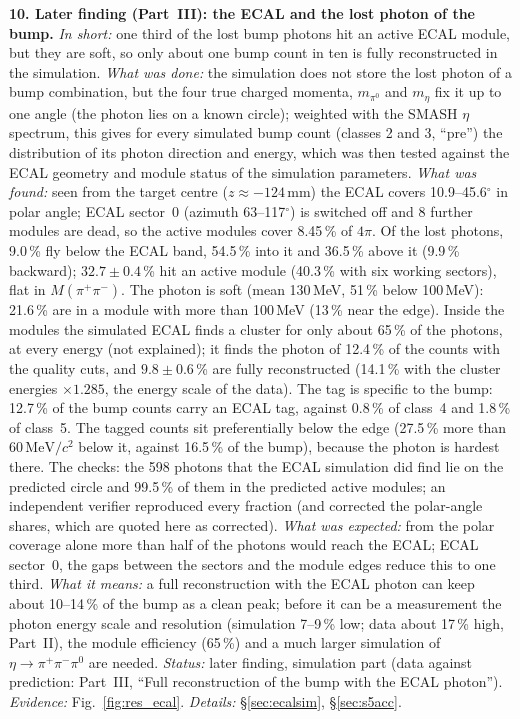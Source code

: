 \documentclass[11pt,a4paper]{article}
\newcommand{\piz}{\ensuremath{\pi^{0}}\xspace}
\newcommand{\pipi}{\ensuremath{\pi^{+}\pi^{-}}\xspace}
\newcommand{\Mpipi}{\ensuremath{M(\pi^{+}\pi^{-})}\xspace}
\newcommand{\MeVcc}{\ensuremath{\mathrm{MeV}/c^{2}}\xspace}
\begin{document}
\textbf{10. Later finding (Part~III): the ECAL and the lost photon of the bump.} \emph{In short:} one third of the lost
bump photons hit an active ECAL module, but they are soft, so only about one bump count in ten is fully reconstructed in the
simulation. \emph{What was done:} the simulation does not store the lost photon of a bump combination, but the four true charged
momenta, $m_{\piz}$ and $m_\eta$ fix it up to one angle (the photon lies on a known circle); weighted with the SMASH $\eta$
spectrum, this gives for every simulated bump count (classes 2 and 3, ``pre'') the distribution of its photon direction and
energy, which was then tested against the ECAL geometry and module status of the simulation parameters. \emph{What was
found:} seen from the target centre ($z\approx-124$\,mm) the ECAL covers 10.9--45.6$^\circ$ in polar angle; ECAL
sector~0 (azimuth 63--117$^\circ$) is switched off and 8 further modules are dead, so the active modules cover 8.45\,\% of $4\pi$.
Of the lost photons, 9.0\,\% fly below the ECAL band, 54.5\,\% into it and 36.5\,\% above it (9.9\,\% backward);
$32.7\pm0.4$\,\% hit an active module (40.3\,\% with six working sectors), flat in \Mpipi. The photon is soft (mean
130\,MeV, 51\,\% below 100\,MeV): 21.6\,\% are in a module with more than 100\,MeV (13\,\% near the edge). Inside the modules
the simulated ECAL finds a cluster for only about 65\,\% of the photons, at every energy (not explained); it finds the
photon of 12.4\,\% of the counts with the quality cuts, and $9.8\pm0.6$\,\% are fully reconstructed (14.1\,\% with the cluster
energies $\times1.285$, the energy scale of the data). The tag is specific to the bump: 12.7\,\% of the bump counts carry
an ECAL tag, against 0.8\,\% of class~4 and 1.8\,\% of class~5. The tagged counts sit preferentially below the edge (27.5\,\%
more than 60\,\MeVcc below it, against 16.5\,\% of the bump), because the photon is hardest there. The checks: the 598
photons that the ECAL simulation did find lie on the predicted circle and 99.5\,\% of them in the predicted active modules;
an independent verifier reproduced every fraction (and corrected the polar-angle shares, which are quoted here as
corrected). \emph{What was expected:} from the polar coverage alone more than half of the photons would reach the ECAL;
ECAL sector~0, the gaps between the sectors and the module edges reduce this to one third.
\emph{What it means:} a full reconstruction with the ECAL photon can keep about 10--14\,\% of the bump as a clean peak;
before it can be a measurement the photon energy scale and resolution (simulation 7--9\,\% low; data about 17\,\% high,
Part~II), the module efficiency (65\,\%) and a much larger simulation of $\eta\to\pipi\piz$ are needed.
\emph{Status:} later finding, simulation part (data against prediction: Part~III, ``Full reconstruction of the bump with
the ECAL photon''). \emph{Evidence:} Fig.~\ref{fig:res_ecal}. \emph{Details:} \S\ref{sec:ecalsim}, \S\ref{sec:s5acc}.
\end{document}
